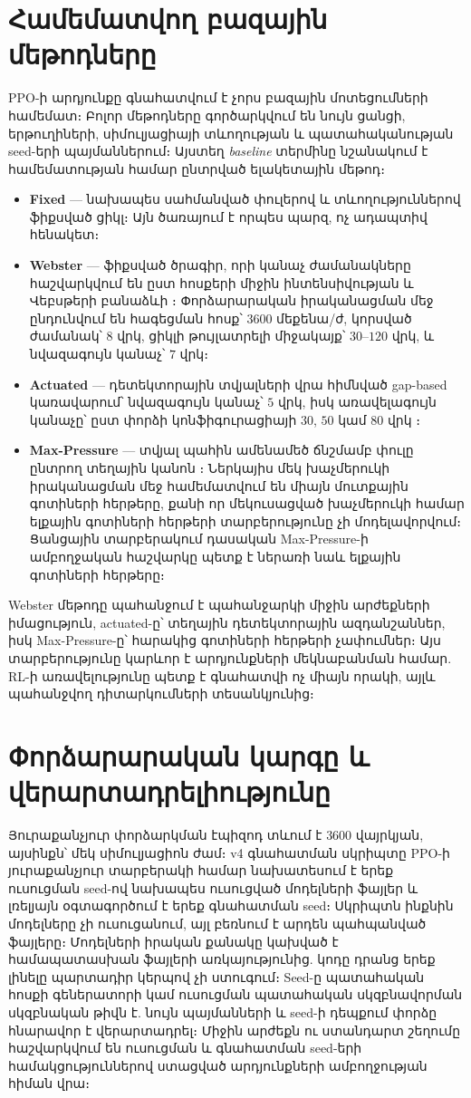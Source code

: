 \documentclass[12pt,a4paper]{extreport}
\begin{document}
\section{Համեմատվող բազային մեթոդները}

PPO-ի արդյունքը գնահատվում է չորս բազային մոտեցումների համեմատ։ Բոլոր մեթոդները գործարկվում են նույն ցանցի, երթուղիների, սիմուլյացիայի տևողության և պատահականության seed-երի պայմաններում։ Այստեղ \textit{baseline} տերմինը նշանակում է համեմատության համար ընտրված ելակետային մեթոդ։

\begin{itemize}
  \item \textbf{Fixed} --- նախապես սահմանված փուլերով և տևողություններով ֆիքսված ցիկլ։ Այն ծառայում է որպես պարզ, ոչ ադապտիվ հենակետ։
  \item \textbf{Webster} --- ֆիքսված ծրագիր, որի կանաչ ժամանակները հաշվարկվում են ըստ հոսքերի միջին ինտենսիվության և Վեբսթերի բանաձևի \cite{webster1958}։ Փորձարարական իրականացման մեջ ընդունվում են հագեցման հոսք՝ $3600$ մեքենա/ժ, կորսված ժամանակ՝ $8$ վրկ, ցիկլի թույլատրելի միջակայք՝ $30$--$120$ վրկ, և նվազագույն կանաչ՝ $7$ վրկ։
  \item \textbf{Actuated} --- դետեկտորային տվյալների վրա հիմնված gap-based կառավարում՝ նվազագույն կանաչ՝ $5$ վրկ, իսկ առավելագույն կանաչը՝ ըստ փորձի կոնֆիգուրացիայի $30$, $50$ կամ $80$ վրկ \cite{sumoTrafficLights}։
  \item \textbf{Max-Pressure} --- տվյալ պահին ամենամեծ ճնշմամբ փուլը ընտրող տեղային կանոն \cite{varaiya2013}։ Ներկայիս մեկ խաչմերուկի իրականացման մեջ համեմատվում են միայն մուտքային գոտիների հերթերը, քանի որ մեկուսացված խաչմերուկի համար ելքային գոտիների հերթերի տարբերությունը չի մոդելավորվում։ Ցանցային տարբերակում դասական Max-Pressure-ի ամբողջական հաշվարկը պետք է ներառի նաև ելքային գոտիների հերթերը։
\end{itemize}

Webster մեթոդը պահանջում է պահանջարկի միջին արժեքների իմացություն, actuated-ը՝ տեղային դետեկտորային ազդանշաններ, իսկ Max-Pressure-ը՝ հարակից գոտիների հերթերի չափումներ։ Այս տարբերությունը կարևոր է արդյունքների մեկնաբանման համար. RL-ի առավելությունը պետք է գնահատվի ոչ միայն որակի, այլև պահանջվող դիտարկումների տեսանկյունից։

\section{Փորձարարական կարգը և վերարտադրելիությունը}

Յուրաքանչյուր փորձարկման էպիզոդ տևում է $3600$ վայրկյան, այսինքն՝ մեկ սիմուլյացիոն ժամ։ v4 գնահատման սկրիպտը PPO-ի յուրաքանչյուր տարբերակի համար նախատեսում է երեք ուսուցման seed-ով նախապես ուսուցված մոդելների ֆայլեր և լռելյայն օգտագործում է երեք գնահատման seed։ Սկրիպտն ինքնին մոդելները չի ուսուցանում, այլ բեռնում է արդեն պահպանված ֆայլերը։ Մոդելների իրական քանակը կախված է համապատասխան ֆայլերի առկայությունից. կոդը դրանց երեք լինելը պարտադիր կերպով չի ստուգում։ Seed-ը պատահական հոսքի գեներատորի կամ ուսուցման պատահական սկզբնավորման սկզբնական թիվն է. նույն պայմանների և seed-ի դեպքում փորձը հնարավոր է վերարտադրել։ Միջին արժեքն ու ստանդարտ շեղումը հաշվարկվում են ուսուցման և գնահատման seed-երի համակցություններով ստացված արդյունքների ամբողջության հիման վրա։
\end{document}
